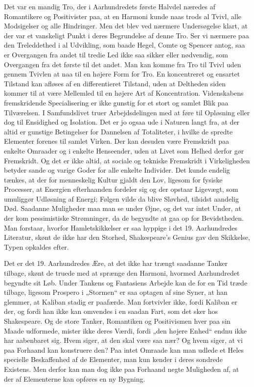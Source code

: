 \documentclass[12pt,a4paper,openany]{book}
\newcommand{\opage}[1]{\marginnote{\footnotesize\textit{[#1]}}}
\begin{document}
Det var en mandig Tro, der i Aarhundredets første Halvdel næredes
af Romantikere og Positivister paa, at en Harmoni kunde naas
trods al Tvivl, alle Modsigelser og alle Hindringer. Men det blev ved
nærmere Undersøgelse klart, at der var et vanskeligt Punkt i deres
Begrundelse af denne Tro. Ser vi nærmere paa den Treleddethed
i al Udvikling, som baade Hegel, Comte og Spencer antog, saa er
Overgangen fra andet til tredie Led ikke saa sikker eller nødvendig,
som Overgangen fra det første til det andet. Man kan komme fra
Tro til Tvivl uden gennem Tvivlen at naa til en højere Form for
Tro. En koncentreret og ensartet Tilstand kan afløses af en differentieret
Tilstand, uden at Deltheden siden kommer til at være Mellemled
til en højere Art af Koncentration. Videnskabens fremskridende
Specialisering er ikke gunstig for et stort og samlet Blik paa Tilværelsen.
I Samfundslivet truer Arbejdsdelingen med at føre til Opløsning
eller dog til Ensidighed og Isolation. Det er jo ogsaa ude i
Naturen langt fra, at der altid er gunstige Betingelser for Dannelsen
af Totaliteter, i hvilke de spredte Elementer forenes til samlet Virken.
Der kan desuden være Fremskridt paa enkelte Omraader og i enkelte
Henseender, uden at Livet som Helhed derfor gør Fremskridt.
Og det er ikke altid, at sociale og tekniske Fremskridt i Virkeligheden
betyder sande og varige Goder for alle enkelte Individer. Det
kunde endelig tænkes, at der for menneskelig Kultur gjaldt den Lov,
ligesom for fysiske Processer, at Energien efterhaanden fordeler sig
og der opstaar Ligevægt, som umuliggør Udløsning af Energi; Følgen
vilde da blive Sløvhed, tilsidst aandelig Død. Saadanne Muligheder
maa man se under Øjne, og det var intet Under, at der kom pessimistiske
Strømninger, da de begyndte at gaa op for Bevidstheden.
Man forstaar, hvorfor Hamletskikkelser er saa hyppige i det 19.
Aarhundredes Literatur, skønt de ikke har den Storhed, Shakespeare’s
Genius gav den Skikkelse, Typen opkaldes efter.

Det er det 19. Aarhundredes Ære, at det ikke har trængt saadanne
Tanker tilbage, skønt de truede med at sprænge den Harmoni,
hvormed Aarhundredet begyndte sit Løb. Under Tankens og
Fantasiens Arbejde kan de for en Tid træde tilbage, ligesom Prospero
i „Stormen“ er saa optagen af sine Syner, at han glemmer, at Kaliban
stadig er paafærde. Man fortvivler ikke, fordi Kaliban er der,
og fordi han ikke kan omvendes i en saadan Fart, som det sker hos
Shakespeare. Og de store Tanker, Romantiken og Positivismen hver
\opage{156}paa sin Maade udformede, mister ikke deres Værdi, fordi „den højere
Enhed“ endnu ikke har aabenbaret sig. Hvem siger, at den skal
være saa nær? Og hvem siger, at vi paa Forhaand kan konstruere
den? Paa intet Omraade kan man udlede et Heles specielle Beskaffenhed
af de Elementer, man kun kender i deres sondrede Existens.
Men derfor kan man dog ikke paa Forhaand negte Muligheden af,
at der af Elementerne kan opføres en ny Bygning.
\end{document}
